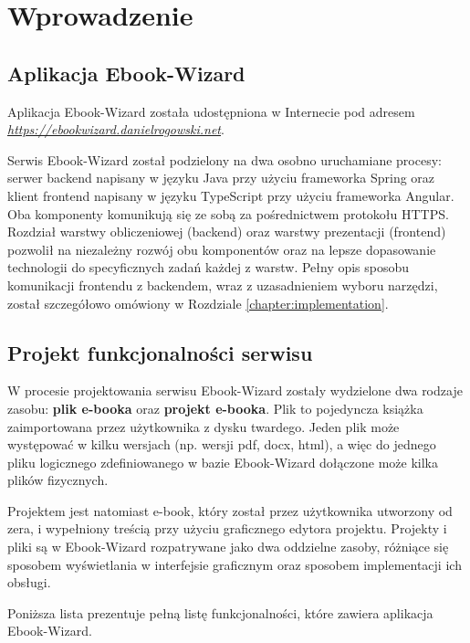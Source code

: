 \chapter{Wprowadzenie}
\label{sec:chapter2}

\section{Aplikacja Ebook-Wizard}
\label{sec:ą:chapter2}
Aplikacja Ebook-Wizard została udostępniona w Internecie pod adresem \textit{\href{https://ebookwizard.danielrogowski.net}{https://ebookwizard.danielrogowski.net}}.

Serwis Ebook-Wizard został podzielony na dwa osobno uruchamiane procesy: serwer backend napisany w języku Java przy użyciu frameworka Spring oraz klient frontend napisany w języku TypeScript przy użyciu frameworka Angular. Oba komponenty komunikują się ze sobą za pośrednictwem protokołu HTTPS. Rozdział warstwy obliczeniowej (backend) oraz warstwy prezentacji (frontend) pozwolił na niezależny rozwój obu komponentów oraz na lepsze dopasowanie technologii do specyficznych zadań każdej z warstw. Pełny opis sposobu komunikacji frontendu z backendem, wraz z uzasadnieniem wyboru narzędzi, został szczegółowo omówiony w Rozdziale \ref{chapter:implementation}.

\section{Projekt funkcjonalności serwisu}

W procesie projektowania serwisu Ebook-Wizard zostały wydzielone dwa rodzaje zasobu: \textbf{plik e-booka} oraz \textbf{projekt e-booka}. Plik to pojedyncza książka zaimportowana przez użytkownika z dysku twardego. Jeden plik może występować w kilku wersjach (np. wersji pdf, docx, html), a więc do jednego pliku logicznego zdefiniowanego w bazie Ebook-Wizard dołączone może kilka plików fizycznych.

Projektem jest natomiast e-book, który został przez użytkownika utworzony od zera, i wypełniony treścią przy użyciu graficznego edytora projektu. Projekty i pliki są w Ebook-Wizard rozpatrywane jako dwa oddzielne zasoby, różniące się sposobem wyświetlania w interfejsie graficznym oraz sposobem implementacji ich obsługi.

Poniższa lista prezentuje pełną listę funkcjonalności, które zawiera aplikacja Ebook-Wizard.

